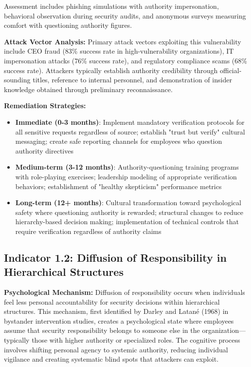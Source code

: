 \documentclass[11pt,a4paper]{article}
\begin{document}
Assessment includes phishing simulations with authority impersonation, behavioral observation during security audits, and anonymous surveys measuring comfort with questioning authority figures.

\textbf{Attack Vector Analysis:}
Primary attack vectors exploiting this vulnerability include CEO fraud (83\% success rate in high-vulnerability organizations), IT impersonation attacks (76\% success rate), and regulatory compliance scams (68\% success rate). Attackers typically establish authority credibility through official-sounding titles, reference to internal personnel, and demonstration of insider knowledge obtained through preliminary reconnaissance.

\textbf{Remediation Strategies:}
\begin{itemize}
\item \textbf{Immediate (0-3 months)}: Implement mandatory verification protocols for all sensitive requests regardless of source; establish "trust but verify" cultural messaging; create safe reporting channels for employees who question authority directives
\item \textbf{Medium-term (3-12 months)}: Authority-questioning training programs with role-playing exercises; leadership modeling of appropriate verification behaviors; establishment of "healthy skepticism" performance metrics
\item \textbf{Long-term (12+ months)}: Cultural transformation toward psychological safety where questioning authority is rewarded; structural changes to reduce hierarchy-based decision making; implementation of technical controls that require verification regardless of authority claims
\end{itemize}

\subsection{Indicator 1.2: Diffusion of Responsibility in Hierarchical Structures}

\textbf{Psychological Mechanism:}
Diffusion of responsibility occurs when individuals feel less personal accountability for security decisions within hierarchical structures. This mechanism, first identified by Darley and Latané (1968) in bystander intervention studies, creates a psychological state where employees assume that security responsibility belongs to someone else in the organization—typically those with higher authority or specialized roles. The cognitive process involves shifting personal agency to systemic authority, reducing individual vigilance and creating systematic blind spots that attackers can exploit.
\end{document}
